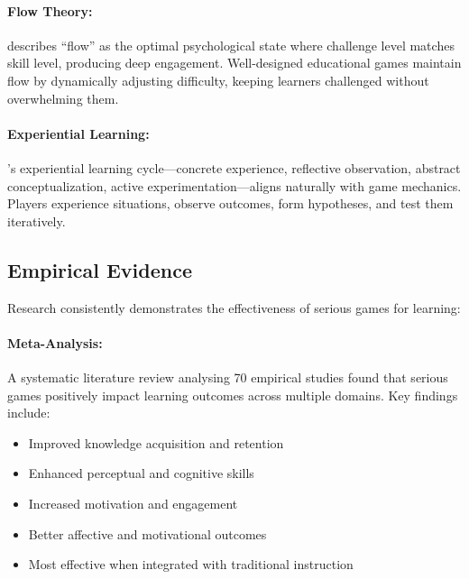 \paragraph*{Flow Theory:}

\citet{csikszentmihalyi1990flow} describes ``flow'' as the optimal psychological state where challenge level matches skill level, producing deep engagement. Well-designed educational games maintain flow by dynamically adjusting difficulty, keeping learners challenged without overwhelming them.

\paragraph*{Experiential Learning:}

\citet{kolb1984experiential}'s experiential learning cycle---concrete experience, reflective observation, abstract conceptualization, active experimentation---aligns naturally with game mechanics. Players experience situations, observe outcomes, form hypotheses, and test them iteratively.

\subsection{Empirical Evidence}
\label{subsec:serious-games-evidence}

Research consistently demonstrates the effectiveness of serious games for learning:

\paragraph*{\citet{connolly2012systematic} Meta-Analysis:}

A systematic literature review analysing 70 empirical studies found that serious games positively impact learning outcomes across multiple domains. Key findings include:

\begin{itemize}
    \item Improved knowledge acquisition and retention
    \item Enhanced perceptual and cognitive skills
    \item Increased motivation and engagement
    \item Better affective and motivational outcomes
    \item Most effective when integrated with traditional instruction
\end{itemize}

